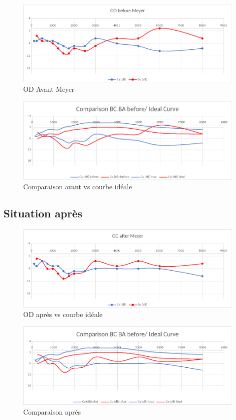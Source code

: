\begin{enumerate}
 	\lipsum[1]
 	
 	\begin{figure}[tbh]
 		\centering
 		\includegraphics[width=0.7\linewidth]{images/clinique/od_before_meyer}
 		\caption{OD Avant Meyer}
 		\label{fig:odbeforemeyer}
 	\end{figure}
 	
 	\lipsum[1]
 	
 	
 	
 	
 	\begin{figure}
 		\centering
 		\includegraphics[width=0.7\linewidth]{images/clinique/comparison_bc_ba_before_vs_ideal_curve_meyer}
 		\caption[Avant vs courbe idéale]{Comparaison avant vs courbe idéale}
 		\label{fig:comparisonbcbabeforevsidealcurvemeyer}
 	\end{figure}
 	
 	
 	\subsection{Situation après}
 	\lipsum[1]
 	\begin{figure}[h]
 		\centering
 		\includegraphics[width=0.7\linewidth]{images/clinique/od_after_meyer}
 		\caption{OD après vs courbe idéale}
 		\label{fig:odaftermeyer}
 	\end{figure}
 
 \lipsum[1]
 
 \begin{figure}[bh]
 	\centering
 	\includegraphics[width=0.7\linewidth]{images/clinique/comparison_bc_ba_after_vs_ideal_curve_meyer}
 	\caption{Comparaison après}
 	\label{fig:comparisonbcbaaftervsidealcurvemeyer}
 \end{figure}
 

\end{enumerate}
